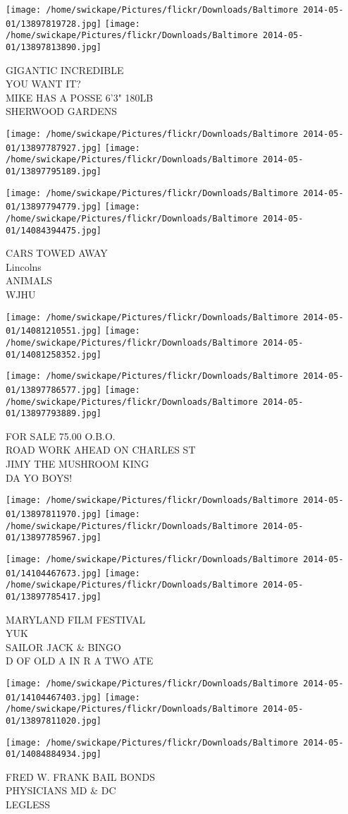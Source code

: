 \documentclass[10pt,letterpaper]{article}
\begin{document}
\texttt{[image: /home/swickape/Pictures/flickr/Downloads/Baltimore 2014-05-01/13897819728.jpg]}
\texttt{[image: /home/swickape/Pictures/flickr/Downloads/Baltimore 2014-05-01/13897813890.jpg]}

GIGANTIC INCREDIBLE\\
YOU WANT IT?\\
MIKE HAS A POSSE 6'3" 180LB\\
SHERWOOD GARDENS
\pagebreak

\texttt{[image: /home/swickape/Pictures/flickr/Downloads/Baltimore 2014-05-01/13897787927.jpg]}
\texttt{[image: /home/swickape/Pictures/flickr/Downloads/Baltimore 2014-05-01/13897795189.jpg]}

\texttt{[image: /home/swickape/Pictures/flickr/Downloads/Baltimore 2014-05-01/13897794779.jpg]}
\texttt{[image: /home/swickape/Pictures/flickr/Downloads/Baltimore 2014-05-01/14084394475.jpg]}

CARS TOWED AWAY\\
Lincolns\\
ANIMALS\\
WJHU
\pagebreak

\texttt{[image: /home/swickape/Pictures/flickr/Downloads/Baltimore 2014-05-01/14081210551.jpg]}
\texttt{[image: /home/swickape/Pictures/flickr/Downloads/Baltimore 2014-05-01/14081258352.jpg]}

\texttt{[image: /home/swickape/Pictures/flickr/Downloads/Baltimore 2014-05-01/13897786577.jpg]}
\texttt{[image: /home/swickape/Pictures/flickr/Downloads/Baltimore 2014-05-01/13897793889.jpg]}

FOR SALE 75.00 O.B.O.\\
ROAD WORK AHEAD ON CHARLES ST\\
JIMY THE MUSHROOM KING\\
DA YO BOYS!
\pagebreak

\texttt{[image: /home/swickape/Pictures/flickr/Downloads/Baltimore 2014-05-01/13897811970.jpg]}
\texttt{[image: /home/swickape/Pictures/flickr/Downloads/Baltimore 2014-05-01/13897785967.jpg]}

\texttt{[image: /home/swickape/Pictures/flickr/Downloads/Baltimore 2014-05-01/14104467673.jpg]}
\texttt{[image: /home/swickape/Pictures/flickr/Downloads/Baltimore 2014-05-01/13897785417.jpg]}

MARYLAND FILM FESTIVAL\\
YUK\\
SAILOR JACK \& BINGO\\
D OF OLD A IN R A TWO ATE
\pagebreak

\texttt{[image: /home/swickape/Pictures/flickr/Downloads/Baltimore 2014-05-01/14104467403.jpg]}
\texttt{[image: /home/swickape/Pictures/flickr/Downloads/Baltimore 2014-05-01/13897811020.jpg]}

\texttt{[image: /home/swickape/Pictures/flickr/Downloads/Baltimore 2014-05-01/14084884934.jpg]}

FRED W. FRANK BAIL BONDS\\
PHYSICIANS MD \& DC\\
LEGLESS
\pagebreak
\end{document}
